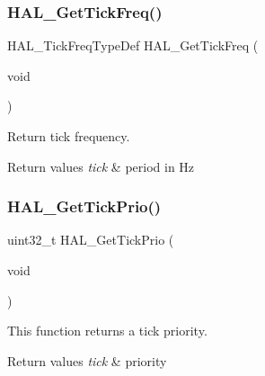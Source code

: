 \subsubsection{\texorpdfstring{H\+A\+L\+\_\+\+Get\+Tick\+Freq()}{HAL\_GetTickFreq()}}
{\footnotesize\ttfamily H\+A\+L\+\_\+\+Tick\+Freq\+Type\+Def H\+A\+L\+\_\+\+Get\+Tick\+Freq (\begin{DoxyParamCaption}\item[{void}]{ }\end{DoxyParamCaption})}



Return tick frequency. 


\begin{DoxyRetVals}{Return values}
{\em tick} & period in Hz \\
\hline
\end{DoxyRetVals}
\mbox{\label{group___h_a_l___exported___functions___group2_gacdcc8b5d33b9f97fe1b0abd6a86a3d4b}} 
\subsubsection{\texorpdfstring{H\+A\+L\+\_\+\+Get\+Tick\+Prio()}{HAL\_GetTickPrio()}}
{\footnotesize\ttfamily uint32\+\_\+t H\+A\+L\+\_\+\+Get\+Tick\+Prio (\begin{DoxyParamCaption}\item[{void}]{ }\end{DoxyParamCaption})}



This function returns a tick priority. 


\begin{DoxyRetVals}{Return values}
{\em tick} & priority \\
\hline
\end{DoxyRetVals}
\mbox{\label{group___h_a_l___exported___functions___group2_ga6b943c94114771a9c29f36042196676e}} 
